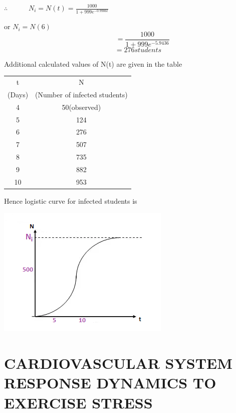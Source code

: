 \begin{center}
	$\therefore$ $~~~~~~~~~~~~N_{i}=N(t)=\frac{1000}{1+999e^{-0.9906t}}$
\end{center} 

\begin{center}
		or $N_{i}=N(6)~~~~~~$ 
		$$~~~~~~~~~~~~~~~~=\dfrac{1000}{1+999e^{-5.9436}}$$ 
		$$~~~~~~~~~~=276 students$$  
\end{center}

\newpage
\vspace*{2cm}
Additional calculated values of N(t) are given in the table \\


\begin{center}
\begin{tabular}{|c|c|}
		\hline
		t & N \\
		(Days)&(Number of infected students) \\
		\hline
		4&50(observed) \\
		\hline
		5&124 \\
		\hline
		6&276 \\
		\hline
		7& 507 \\
		\hline
		8&735 \\
		\hline
		9&882 \\
		\hline
		10&953 \\
		\hline
	\end{tabular}
\end{center}
\vspace*{1cm}
Hence logistic curve for infected students is

\begin{center}
	\scalebox{1.20} %
	{\includegraphics{graph6.png}} 
\end{center}


\pagebreak

\section{CARDIOVASCULAR SYSTEM RESPONSE DYNAMICS TO EXERCISE STRESS}



